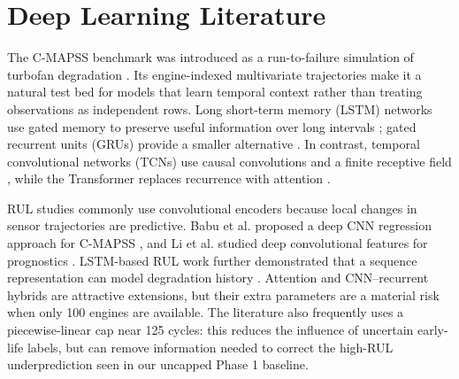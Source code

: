 \section{Deep Learning Literature}
\label{sec:literature}

The C-MAPSS benchmark was introduced as a run-to-failure simulation of
turbofan degradation \cite{saxena_2008_damage_prognosis}.  Its engine-indexed
multivariate trajectories make it a natural test bed for models that learn
temporal context rather than treating observations as independent rows.
Long short-term memory (LSTM) networks use gated memory to preserve useful
information over long intervals \cite{hochreiter_1997_lstm}; gated recurrent
units (GRUs) provide a smaller alternative \cite{cho_2014_gru}.  In contrast,
temporal convolutional networks (TCNs) use causal convolutions and a finite
receptive field \cite{bai_2018_tcn}, while the Transformer replaces recurrence
with attention \cite{vaswani_2017_transformer}.

RUL studies commonly use convolutional encoders because local changes in
sensor trajectories are predictive.  Babu et al. proposed a deep CNN
regression approach for C-MAPSS \cite{babu_2016_dcnn}, and Li et al. studied
deep convolutional features for prognostics \cite{li_2018_dcnn}.  LSTM-based
RUL work further demonstrated that a sequence representation can model
degradation history \cite{zheng_2017_lstm}.  Attention and CNN--recurrent
hybrids are attractive extensions, but their extra parameters are a material
risk when only 100 engines are available.  The literature also frequently
uses a piecewise-linear cap near 125 cycles: this reduces the influence of
uncertain early-life labels, but can remove information needed to correct the
high-RUL underprediction seen in our uncapped Phase 1 baseline.

\begin{table}[t]
\caption{Scope of the reviewed literature. ``n/a'' means that the source or
the accessible report did not state the item unambiguously.}
\label{tab:literature}
\centering
\scriptsize
{}
\end{table}

